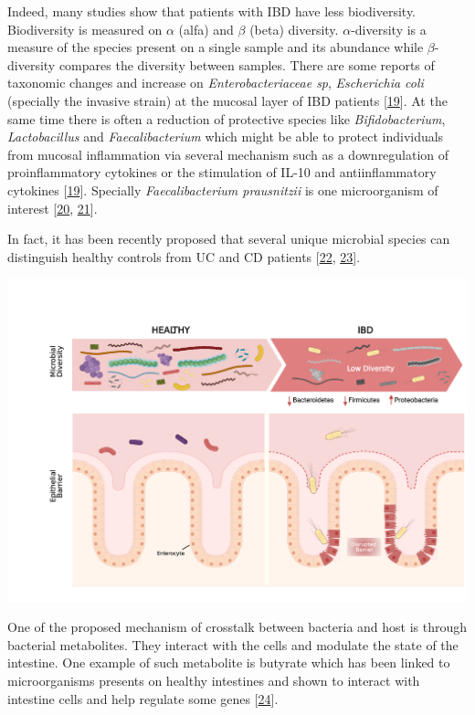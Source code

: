 \documentclass[
  12pt,
  a4paper,
  twoside,
  openright]{book}
\let\origfigure\figure
\let\endorigfigure\endfigure
\renewenvironment{figure}[1][2] {
    \expandafter\origfigure\expandafter[!htp]
} {
    \endorigfigure
}
\begin{document}
Indeed, many studies show that patients with IBD have less biodiversity.
Biodiversity is measured on \(\alpha\) (alfa) and \(\beta\) (beta) diversity.
\(\alpha\)-diversity is a measure of the species present on a single sample and its abundance while \(\beta\)-diversity compares the diversity between samples.
There are some reports of taxonomic changes and increase on \emph{Enterobacteriaceae sp}, \emph{Escherichia coli} (specially the invasive strain) at the mucosal layer of IBD patients {[}\protect\hyperlink{ref-ott2004}{19}{]}.
At the same time there is often a reduction of protective species like \emph{Bifidobacterium}, \emph{Lactobacillus} and \emph{Faecalibacterium} which might be able to protect individuals from mucosal inflammation via several mechanism such as a downregulation of proinflammatory cytokines or the stimulation of IL-10 and antiinflammatory cytokines {[}\protect\hyperlink{ref-ott2004}{19}{]}.
Specially \emph{Faecalibacterium prausnitzii} is one microorganism of interest {[}\protect\hyperlink{ref-kostic2014}{20}, \protect\hyperlink{ref-sender2016}{21}{]}.

In fact, it has been recently proposed that several unique microbial species can distinguish healthy controls from UC and CD patients {[}\protect\hyperlink{ref-sankarasubramanian2020}{22}, \protect\hyperlink{ref-lopez-siles2014}{23}{]}.

\begin{figure}
\includegraphics[width=1\linewidth]{images/tesis_AM_Figure2} \caption{The microbial composition in a healthy and IBD gut.}\label{fig:composition}
\end{figure}

One of the proposed mechanism of crosstalk between bacteria and host is through bacterial metabolites.
They interact with the cells and modulate the state of the intestine.
One example of such metabolite is butyrate which has been linked to microorganisms presents on healthy intestines and shown to interact with intestine cells and help regulate some genes {[}\protect\hyperlink{ref-ferrer-picuxf3n2020}{24}{]}.
\end{document}
